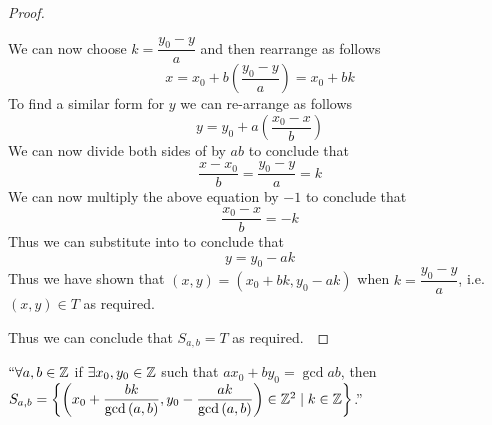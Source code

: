 \begin{proof}
\begin{itemize}
                    We can now choose $k = \dfrac{y_0 - y}{a}$ and then rearrange
                     as follows
                    \[
                        x = x_0 + b\left(\frac{y_0 - y}{a}\right) = x_0 + bk
                    \]
                    To find a similar form for $y$ we can re-arrange
                     as follows
                    \begin{equation}
                        y = y_0 + a\left(\frac{x_0 - x}{b}\right)
                        \label{LDE All Solutions equation 3}
                    \end{equation}
                    We can now divide both sides of  by
                    $ab$ to conclude that
                    \[
                        \frac{x - x_0}{b} = \frac{y_0 - y}{a} = k
                    \]
                    We can now multiply the above equation by $-1$ to conclude that
                    \begin{equation}
                        \frac{x_0 - x}{b} = -k 
                        \label{LDE All Solutions equation 4}
                    \end{equation}
                    Thus we can substitute  into
                     to conclude that
                    \[
                        y = y_0 - ak
                    \]
                    Thus we have shown that $(x, y) = (x_0 + bk, y_0 - ak)$ when $k = \dfrac{y_0 - y}{a}$,
                    i.e. $(x, y) \in T$ as required.
            \end{itemize} 
           Thus we can conclude that $S_{a, b} = T$ as required.~\QED
        \end{proof}
        \begin{theorem}
            $``\forall a, b \in \mathbb{Z}$ if $\exists x_0, y_0 \in \mathbb{Z}$ such that
            $ax_0 + by_0 = \gcd{a}{b}$, then  $S_{a, b} =
            \left\{\left(x_0 + \dfrac{bk}{\mathrm{gcd}\left(a, b\right)}, y_0 - \dfrac{ak}{\mathrm{gcd}\left(a, b\right)}\right) \in \mathbb{Z}^2 \mid
            k \in \mathbb{Z}\right\}$.''
        \end{theorem}
